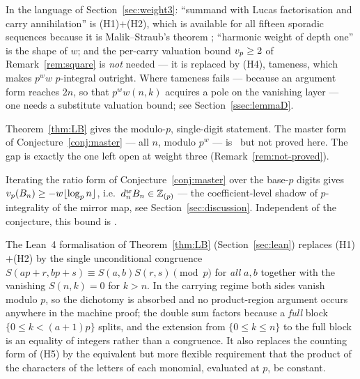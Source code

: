 \begin{remark}\label{rem:needs}
In the language of Section~\ref{sec:weight3}: ``summand with Lucas factorisation and carry
annihilation'' is (H1)$+$(H2), which is available for all fifteen sporadic sequences
because it is Malik--Straub's theorem \cite{MalikStraub}; ``harmonic weight of depth one''
is the shape of $w$; and the per-carry valuation bound $v_p\ge2$ of
Remark~\ref{rem:square} is \emph{not} needed --- it is replaced by (H4), tameness, which
makes $p^ww$ $p$-integral outright. Where tameness fails --- because an argument form
reaches $2n$, so that $p^w w(n,k)$ acquires a pole on the vanishing layer --- one needs a
substitute valuation bound; see Section~\ref{ssec:lemmaD}.
\end{remark}

\begin{remark}\label{rem:LBscope}
Theorem~\ref{thm:LB} gives the modulo-$p$, single-digit statement. The master form of
Conjecture~\ref{conj:master} --- all $n$, modulo $p^w$ --- is \Verified\ but not proved
here. The gap is exactly the one left open at weight three
(Remark~\ref{rem:not-proved}).
\end{remark}

\begin{corollary}[integrality]\label{cor:integrality}
Iterating the ratio form of Conjecture~\ref{conj:master} over the base-$p$ digits gives
$v_p(B_n)\ge-w\lfloor\log_pn\rfloor$, i.e.\ $d_n^{w}B_n\in\mathbb{Z}_{(p)}$ --- the coefficient-level
shadow of $p$-integrality of the mirror map, see Section~\ref{sec:discussion}. Independent
of the conjecture, this bound is .
\end{corollary}

\begin{remark}\label{rem:leanH}
The Lean~4 formalisation of Theorem~\ref{thm:LB} (Section~\ref{sec:lean}) replaces
(H1)$+$(H2) by the single unconditional congruence
$S(ap+r,bp+s)\equiv S(a,b)S(r,s)\pmod p$ for \emph{all} $a,b$ together with the vanishing
$S(n,k)=0$ for $k>n$. In the carrying regime both sides vanish modulo $p$, so the
dichotomy is absorbed and no product-region argument occurs anywhere in the machine proof;
the double sum factors because a \emph{full} block $\{0\le k<(a+1)p\}$ splits, and the
extension from $\{0\le k\le n\}$ to the full block is an equality of integers rather than
a congruence. It also replaces the counting form of (H5) by the equivalent but more
flexible requirement that the product of the characters of the letters of each monomial,
evaluated at $p$, be constant.
\end{remark}
